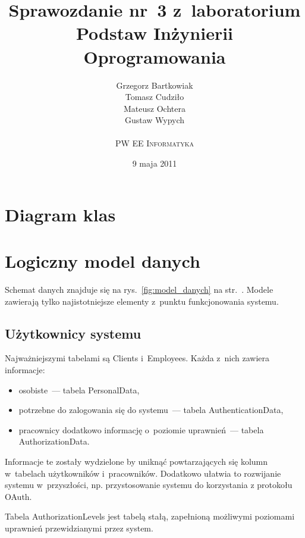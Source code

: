 \documentclass[10pt,a4paper]{article}
\newcommand{\s}[1]{\textsf{#1}}
\begin{document}
\title{
  Sprawozdanie nr~3 z~laboratorium\\Podstaw Inżynierii Oprogramowania
}
\author{
  Grzegorz Bartkowiak\\
  Tomasz Cudziło\\
  Mateusz Ochtera\\
  Gustaw Wypych\\
  \\
  \textsc{PW EE Informatyka}\\[10pt]
}
\date{9 maja 2011}
\maketitle

\section{Diagram klas}

\section{Logiczny model danych}

Schemat danych znajduje się na rys.~\ref{fig:model_danych} na
str.~\pageref{fig:model_danych}. Modele zawierają tylko najistotniejsze
elementy z~punktu funkcjonowania systemu.

\subsection{Użytkownicy systemu}

\noindent Najważniejszymi tabelami są \s{Clients} i~\s{Employees}. Każda z~nich
zawiera informacje:

\begin{itemize}
  \item osobiste~--- tabela \s{PersonalData},
  \item potrzebne do zalogowania się do systemu~--- tabela
    \s{AuthenticationData},
  \item pracownicy dodatkowo informację o~poziomie uprawnień~--- tabela
    \s{AuthorizationData}.
\end{itemize}

Informacje te zostały wydzielone by uniknąć powtarzających się kolumn
w~tabelach użytkowników i~pracowników. Dodatkowo ułatwia to rozwijanie systemu
w~przyszłości, np. przystosowanie systemu do korzystania z protokołu OAuth.

Tabela \s{AuthorizationLevels} jest tabelą stałą, zapełnioną możliwymi
poziomami uprawnień przewidzianymi przez system.
\end{document}
